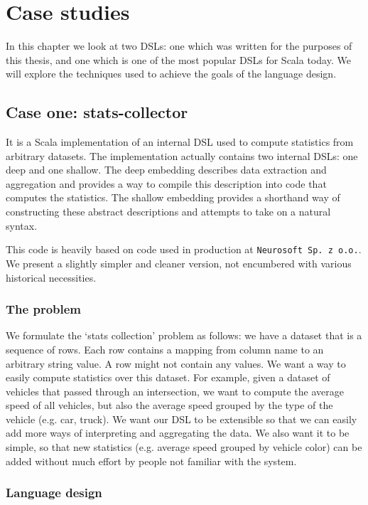 \chapter{Case studies}

In this chapter we look at two DSLs: one which was written for the purposes of this thesis, and one which is one of the most popular DSLs for Scala today.
We will explore the techniques used to achieve the goals of the language design.

\section{Case one: stats-collector}

It is a Scala implementation of an internal DSL used to compute statistics from arbitrary datasets.
The implementation actually contains two internal DSLs: one deep and one shallow.
The deep embedding describes data extraction and aggregation and provides a way to compile this description into code that computes the statistics.
The shallow embedding provides a shorthand way of constructing these abstract descriptions and attempts to take on a natural syntax.

This code is heavily based on code used in production at \texttt{Neurosoft~Sp.~z~o.o.}.
We present a slightly simpler and cleaner version, not encumbered with various historical necessities.

\subsection{The problem}

We formulate the `stats collection' problem as follows: we have a dataset that is a sequence of rows.
Each row contains a mapping from column name to an arbitrary string value.
A row might not contain any values.
We want a way to easily compute statistics over this dataset.
For example, given a dataset of vehicles that passed through an intersection, we want to compute the average speed of all vehicles, but also the average speed grouped by the type of the vehicle (e.g. car, truck).
We want our DSL to be extensible so that we can easily add more ways of interpreting and aggregating the data.
We also want it to be simple, so that new statistics (e.g. average speed grouped by vehicle color) can be added without much effort by people not familiar with the system.

\subsection{Language design}

